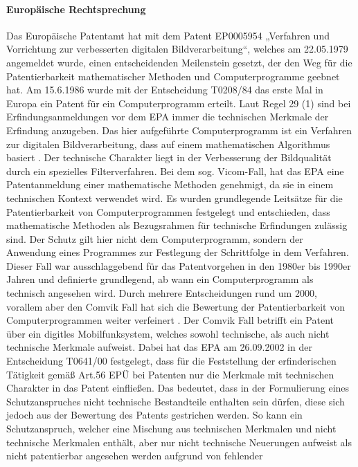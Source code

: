 \paragraph{Europäische Rechtsprechung}
Das Europäische Patentamt hat mit dem Patent EP0005954 
„Verfahren und Vorrichtung zur verbesserten digitalen Bildverarbeitung“,
welches am 22.05.1979 angemeldet wurde,
einen entscheidenden Meilenstein gesetzt, 
der den Weg für die Patentierbarkeit mathematischer Methoden und 
Computerprogramme geebnet hat. 
Am 15.6.1986 wurde mit der Entscheidung T0208/84 das
erste Mal in Europa ein Patent für ein Computerprogramm erteilt.
Laut Regel 29 (1) sind bei Erfindungsanmeldungen vor dem EPA
immer die 
technischen Merkmale der Erfindung anzugeben.
Das hier aufgeführte Computerprogramm ist ein 
Verfahren zur digitalen Bildverarbeitung, dass
auf einem mathematischen Algorithmus basiert \cite{EPThisFile}.
Der technische Charakter liegt in der Verbesserung 
der Bildqualität durch ein spezielles Filterverfahren.
Bei dem sog. Vicom-Fall,
hat das EPA eine Patentanmeldung einer
mathematische Methoden genehmigt, da sie in einem technischen Kontext 
verwendet wird. 
Es wurden grundlegende Leitsätze für die Patentierbarkeit von
Computerprogrammen festgelegt und entschieden, dass mathematische
Methoden als Bezugsrahmen für technische Erfindungen zulässig sind.
Der Schutz gilt hier nicht dem Computerprogramm,
sondern der Anwendung eines Programmes 
zur Festlegung der Schrittfolge in dem Verfahren.
Dieser Fall war ausschlaggebend für das Patentvorgehen
in den 1980er bis 1990er Jahren und definierte grundlegend,
ab wann ein Computerprogramm als technisch angesehen wird.
Durch mehrere Entscheidungen rund um 2000, vorallem aber den 
Comvik Fall hat sich die Bewertung der Patentierbarkeit von
Computerprogrammen weiter verfeinert \cite{ComvikAnsatz}.
Der Comvik Fall \cite{064100Zwei} betrifft ein Patent 
über ein digitles Mobilfunksystem, welches sowohl technische,
als auch nicht technische Merkmale aufweist. 
Dabei hat das EPA am 26.09.2002 in der
Entscheidung T0641/00 festgelegt, dass für die Feststellung der
erfinderischen Tätigkeit gemäß Art.56 EPÜ bei Patenten nur die 
Merkmale mit technischen Charakter in das Patent einfließen.
Das bedeutet, dass in der Formulierung eines Schutzanspruches
nicht technische Bestandteile enthalten sein dürfen, 
diese sich jedoch aus der Bewertung des Patents gestrichen werden.
So kann ein Schutzanspruch, welcher eine Mischung aus technischen 
Merkmalen und nicht technische 
Merkmalen enthält, aber nur nicht technische Neuerungen aufweist 
als nicht patentierbar angesehen werden aufgrund von fehlender
